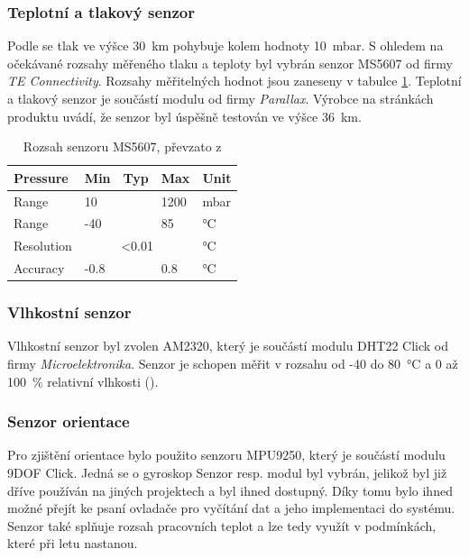 \documentclass[twoside]{ctuthesis}
\theoremstyle{plain}
\theoremstyle{definition}
\theoremstyle{note}
\begin{document}
			
			\subsubsection{Teplotní a tlakový senzor}
			Podle \cite{dsh_alt2press} se tlak ve výšce 30~km pohybuje kolem hodnoty 10~mbar. S ohledem na očekávané rozsahy měřeného tlaku a teploty byl vybrán senzor MS5607 od firmy \textit{TE Connectivity}. Rozsahy měřitelných hodnot jsou zaneseny v tabulce \ref{tab:ms:range}. Teplotní a tlakový senzor je součástí modulu od firmy \textit{Parallax}. Výrobce na stránkách produktu \cite{ms_product} uvádí, že senzor byl úspěšně testován ve výšce 36~km.
			
			\begin{table}[]
				\begin{tabular}{|l|lll|l|}
				\hline
				Pressure   & \multicolumn{1}{l|}{Min}  & \multicolumn{1}{l|}{Typ} & Max  & Unit \\ \hline
				Range      & \multicolumn{1}{l|}{10}   & \multicolumn{1}{l|}{}    & 1200 & mbar \\ \hline
				Range      & \multicolumn{1}{l|}{-40}  & \multicolumn{1}{l|}{}    & 85   & °C   \\ \hline
				Resolution & \multicolumn{3}{c|}{\textless{}0.01}                        & °C   \\ \hline
				Accuracy   & \multicolumn{1}{l|}{-0.8} & \multicolumn{1}{l|}{}    & 0.8  & °C   \\ \hline
				\end{tabular}
				\caption{Rozsah senzoru MS5607, převzato z \cite{dsh_MS5607}}
				\label{tab:ms:range}
			\end{table}

			


			
			\subsubsection{Vlhkostní senzor}
			Vlhkostní senzor byl zvolen AM2320, který je součástí modulu DHT22 Click od firmy \textit{Microelektronika}. Senzor je schopen měřit v rozsahu od -40 do 80~°C a 0 až 100~\% relativní vlhkosti (). 



			
			\subsubsection{Senzor orientace}
			Pro zjištění orientace bylo použito senzoru MPU9250, který je součástí modulu 9DOF Click. Jedná se o gyroskop Senzor resp. modul byl vybrán, jelikož byl již dříve používán na jiných projektech a byl ihned dostupný. Díky tomu bylo ihned možné přejít ke psaní ovladače pro vyčítání dat a jeho implementaci do systému. Senzor také splňuje rozsah pracovních teplot \cite{dsh_mpu} a lze tedy využít v podmínkách, které při letu nastanou.  
			
\end{document}
